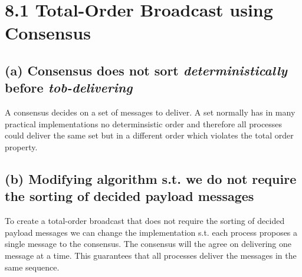 \documentclass{article}
\begin{document}
	\pagestyle{fancy}
	\section*{8.1 Total-Order Broadcast using Consensus}
	\begin{adjustwidth}{2em}{2em}
		\subsection*{(a) Consensus does not sort \textit{deterministically} before \textit{tob-delivering}}
		\begin{adjustwidth}{2em}{2em}
			A consensus decides on a set of messages to deliver. A set normally has in many practical implementations no determinsistic order and therefore all processes could deliver the same set but in a different order which violates the total order property.
		\end{adjustwidth}
		\subsection*{(b) Modifying algorithm s.t. we do not require the sorting of decided payload messages}
		\begin{adjustwidth}{2em}{2em}
		To create a total-order broadcast that does not require the sorting of decided payload messages we can change the implementation s.t. each process proposes a single message to the consensus. The consensus will the agree on delivering one message at a time. This guarantees that all processes deliver the messages in the same sequence.
		\end{adjustwidth}
	\end{adjustwidth}
	
\end{document}
